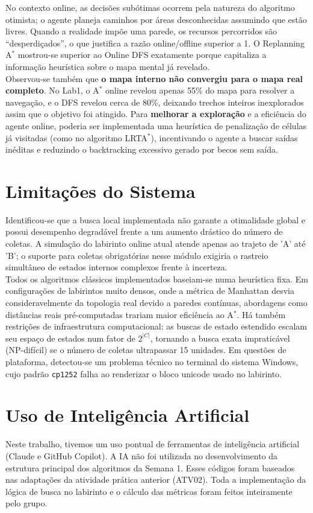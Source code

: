\documentclass[12pt,a4paper]{article}
\begin{document}
No contexto online, as decisões subótimas ocorrem pela natureza do algoritmo otimista; o agente planeja caminhos por áreas desconhecidas assumindo que estão livres. Quando a realidade impõe uma parede, os recursos percorridos são ``desperdiçados'', o que justifica a razão online/offline superior a 1. O Replanning A$^*$ mostrou-se superior ao Online DFS exatamente porque capitaliza a informação heurística sobre o mapa mental já revelado.
\\

Observou-se também que \textbf{o mapa interno não convergiu para o mapa real completo}. No Lab1, o A$^*$ online revelou apenas 55\% do mapa para resolver a navegação, e o DFS revelou cerca de 80\%, deixando trechos inteiros inexplorados assim que o objetivo foi atingido. Para \textbf{melhorar a exploração} e a eficiência do agente online, poderia ser implementada uma heurística de penalização de células já visitadas (como no algoritmo LRTA$^*$), incentivando o agente a buscar saídas inéditas e reduzindo o backtracking excessivo gerado por becos sem saída.

\section{Limitações do Sistema}
Identificou-se que a busca local implementada não garante a otimalidade global e possui desempenho degradável frente a um aumento drástico do número de coletas. A simulação do labirinto online atual atende apenas ao trajeto de 'A' até 'B'; o suporte para coletas obrigatórias nesse módulo exigiria o rastreio simultâneo de estados internos complexos frente à incerteza.
\\

Todos os algoritmos clássicos implementados baseiam-se numa heurística fixa. Em configurações de labirintos muito densos, onde a métrica de Manhattan desvia consideravelmente da topologia real devido a paredes contínuas, abordagens como distâncias reais pré-computadas trariam maior eficiência ao A$^*$. Há também restrições de infraestrutura computacional: as buscas de estado estendido escalam seu espaço de estados num fator de $2^{|C|}$, tornando a busca exata impraticável (NP-difícil) se o número de coletas ultrapassar 15 unidades. Em questões de plataforma, detectou-se um problema técnico no terminal do sistema Windows, cujo padrão \texttt{cp1252} falha ao renderizar o bloco unicode usado no labirinto.

\section{Uso de Inteligência Artificial}
Neste trabalho, tivemos um uso pontual de ferramentas de inteligência artificial (Claude e GitHub Copilot). A IA não foi utilizada no desenvolvimento da estrutura principal dos algoritmos da Semana 1. Esses códigos foram baseados nas adaptações da atividade prática anterior (ATV02). Toda a implementação da lógica de busca no labirinto e o cálculo das métricas foram feitos inteiramente pelo grupo.
\\
\end{document}
